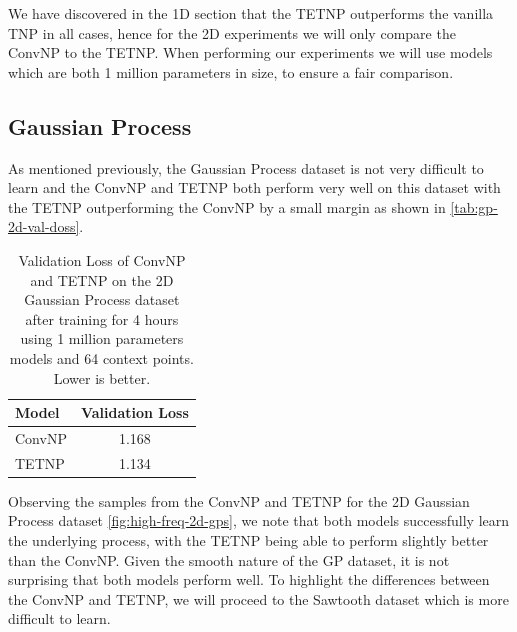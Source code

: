 \documentclass[../../main.tex]{subfiles}
\begin{document}
We have discovered in the 1D section that the TETNP outperforms the vanilla TNP in all cases, hence for the 2D experiments we will only compare the ConvNP to the TETNP. When performing our experiments we will use models which are both 1 million parameters in size, to ensure a fair comparison.

\subsection{Gaussian Process}

As mentioned previously, the Gaussian Process dataset is not very difficult to learn and the ConvNP and TETNP both perform very well on this dataset with the TETNP outperforming the ConvNP by a small margin as shown in \autoref{tab:gp-2d-val-doss}.

\begin{table}[ht]
    \centering
    \begin{tabular}{lc}
        \toprule
        Model  & Validation Loss \\
        \midrule
        ConvNP & 1.168           \\
        TETNP  & 1.134           \\
        \bottomrule
    \end{tabular}
    \caption{Validation Loss of ConvNP and TETNP on the 2D Gaussian Process dataset after training for 4 hours using 1 million parameters models and 64 context points. Lower is better.}
    \label{tab:gp-2d-val-doss}
\end{table}

Observing the samples from the ConvNP and TETNP for the 2D Gaussian Process dataset \autoref{fig:high-freq-2d-gps}, we note that both models successfully  learn the underlying process, with the TETNP being able to perform slightly better than the ConvNP. Given the smooth nature of the GP dataset, it is not surprising that both models perform well. To highlight the differences between the ConvNP and TETNP, we will proceed to the Sawtooth dataset which is more difficult to learn.

\end{document}
